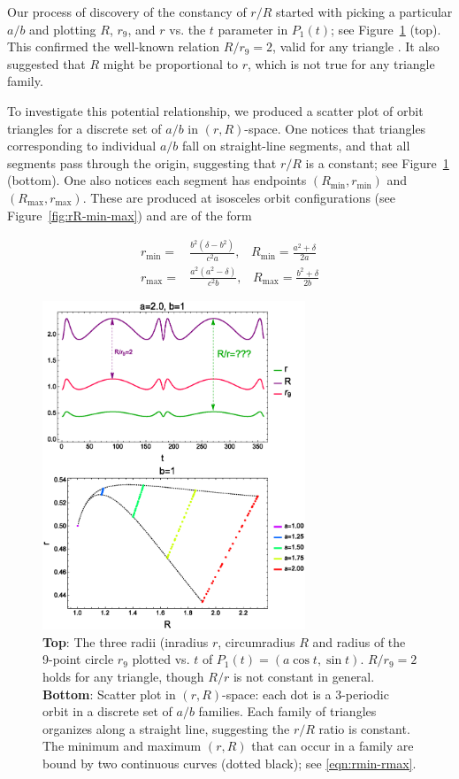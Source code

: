 Our process of discovery of the constancy of $r/R$ started with picking a particular $a/b$ and plotting $R$, $r_9$, and $r$ vs. the $t$ parameter in $P_1(t)$; see Figure~\ref{fig:radii-grid2} (top). This confirmed the well-known relation $R/r_9=2$, valid for any triangle \cite{coxeter67}. It also suggested  that $R$ might be proportional to $r$, which is not true for any triangle family.

To investigate this potential relationship, we produced a scatter plot of orbit triangles for a discrete set of $a/b$ in $(r,R)$-space. One notices that triangles corresponding to individual $a/b$ fall on straight-line segments, and that all segments pass through the origin, suggesting that $r/R$ is a constant; see Figure~\ref{fig:radii-grid2} (bottom). One also notices each segment has endpoints $(R_\text{min},r_\text{min})$ and $(R_\text{max},r_\text{max})$. These are produced at isosceles orbit configurations (see Figure~\ref{fig:rR-min-max}) and are of the form

\begin{align}
r_{\mathrm{min}}=&  \frac{b^2(\delta - b^2)}{c^2 a},\;\;\;R_{\mathrm{min}}= \frac{a^2+\delta}{2a} \nonumber \\
r_{\mathrm{max}}=&  \frac{a^2(a^2 - \delta)}{c^2 b},\;\;\;R_{\mathrm{max}}= \frac{b^2+\delta}{2b}
\label{eqn:rmin-rmax}
\end{align}

\begin{figure}[H]
    \centering
    \includegraphics[width=0.70\textwidth]{1050_radii_grid2.eps}
    \caption{\textbf{Top}: The three radii (inradius $r$, circumradius $R$ and radius of the 9-point circle $r_9$ plotted vs. $t$ of $P_1(t)=(a \cos t,\sin t)$. $R/r_9=2$ holds for any triangle, though $R/r$ is not constant in general. \textbf{Bottom}: Scatter plot in $(r,R)$-space: each dot is a 3-periodic orbit in a discrete set of $a/b$ families. Each family of triangles organizes along a straight line, suggesting the $r/R$ ratio is constant. The minimum and maximum $(r,R)$ that can occur in a family are bound by two continuous curves (dotted black); see \eqref{eqn:rmin-rmax}.}
    \label{fig:radii-grid2}
\end{figure}

